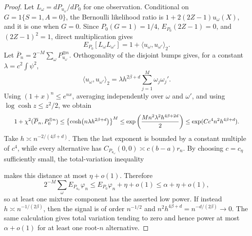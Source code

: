 \documentclass{article}
\begin{document}
\begin{proof}
Let \(L_\omega=dP_{u_\omega}/dP_0\) for one observation. Conditional on \(G=1\{S=1,A=0\}\), the Bernoulli likelihood ratio is \(1+2(2Z-1)u_\omega(X)\), and it is one when \(G=0\). Since \(P_0(G=1)=1/4\), \(E_{P_0}(2Z-1)=0\), and \((2Z-1)^2=1\), direct multiplication gives\[E_{P_0}[L_\omega L_{\omega'}]=1+\langle u_\omega,u_{\omega'}\rangle_2.\]Let \(\overline P_n=2^{-M}\sum_\omega P_{u_\omega}^{\otimes n}\). Orthogonality of the disjoint bumps gives, for a constant \(\lambda=c^2\int\psi^2\),\[\langle u_\omega,u_{\omega'}\rangle_2=\lambda h^{2\beta+d}\sum_{j=1}^M\omega_j\omega_j'.\]Using \((1+x)^n\le e^{nx}\), averaging independently over \(\omega\) and \(\omega'\), and using \(\log\cosh z\le z^2/2\), we obtain\[
\makebox[\linewidth][c]{\resizebox{0.98\linewidth}{!}{\par\noindent \makebox[\linewidth][c]{\resizebox{0.98\linewidth}{!}{\(\displaystyle \displaystyle 1+\chi^2(\overline P_n,P_0^{\otimes n})\le\left\{\cosh\bigl(n\lambda h^{2\beta+d}\bigr)\right\}^M\le\exp\left(\frac{M n^2\lambda^2h^{4\beta+2d}}2\right)\le\exp(Cc^4n^2h^{4\beta+d}).\)}}\par\noindent}}
\]Take \(h\asymp n^{-2/(4\beta+d)}\). Then the last exponent is bounded by a constant multiple of \(c^4\), while every alternative has \(C_{P_{u_\omega}}(0,0)\asymp c(b-a)r_n\). By choosing \(c=c_\eta\) sufficiently small, the total-variation inequality \par\noindent {}\par\noindent makes this distance at most \(\eta+o(1)\). Therefore\[2^{-M}\sum_\omega E_{P_{u_\omega}}\varphi_n\le E_{P_0}\varphi_n+\eta+o(1)\le\alpha+\eta+o(1),\]so at least one mixture component has the asserted low power. If instead \(h\asymp n^{-1/(2\beta)}\), then the signal is of order \(n^{-1/2}\) and \(n^2h^{4\beta+d}=n^{-d/(2\beta)}\to0\). The same calculation gives total variation tending to zero and hence power at most \(\alpha+o(1)\) for at least one root-\(n\) alternative.


\end{proof}
\end{document}
